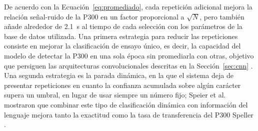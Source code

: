 De acuerdo con la Ecuación~\eqref{eq:promediado}, cada repetición adicional mejora la relación
señal-ruido de la P300 en un factor proporcional a $\sqrt{N}$, pero también añade alrededor de
2.1~s al tiempo de cada selección con los parámetros de la base de datos utilizada. Una primera
estrategia para reducir las repeticiones consiste en mejorar la clasificación de ensayo único, es
decir, la capacidad del modelo de detectar la P300 en una sola época sin promediarla con otras,
objetivo que persiguen las arquitecturas convolucionales descritas en la Sección~\ref{sec:cnn}
\cite{cecotti2011,lawhern2018}. Una segunda estrategia es la parada dinámica, en la que el sistema
deja de presentar repeticiones en cuanto la confianza acumulada sobre algún carácter supera un
umbral, en lugar de usar siempre un número fijo; Speier et al. mostraron que combinar este tipo de
clasificación dinámica con información del lenguaje mejora tanto la exactitud como la tasa de
transferencia del P300 Speller \cite{speier2012}.
